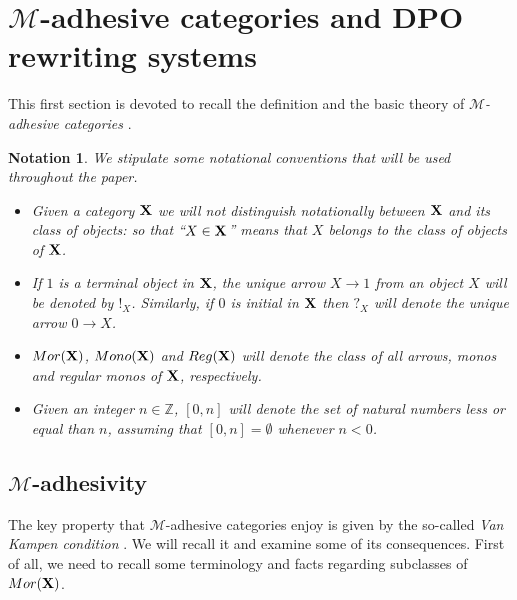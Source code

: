 \documentclass[a4paper,UKenglish,cleveref,pdftex, thm-restate,numberwithinsect,anonymous]{lipics}
\newcommand{\mor}{\mathsf{Mor}}
\newcommand{\mon}{\mathsf{Mono}}
\newcommand{\reg}{\mathsf{Reg}}
\def\X{\textbf {\textup{X}}}
\def\Set{\textbf {\textup{Set}}}
\newtheorem*{notation}{Notation}
\begin{document}
\section{$\mathcal{M}$-adhesive categories and DPO rewriting systems}\label{sec:ade}

This first section is devoted to recall the definition and the basic theory of \emph{$\mathcal{M}$-adhesive categories} \cite{azzi2019essence,ehrig2012,ehrig2014adhesive,lack2005adhesive,heindel2009category}.

\begin{notation}
  We stipulate some notational conventions that will be used
  throughout the paper.
  \begin{itemize}
  \item
    Given a category $\X$ we will not distinguish notationally
    between $\X$ and its class of objects: so that ``$X\in \X$'' means
    that $X$ belongs to the class of objects of $\X$.

  \item
    If $1$ is a terminal object in $\X$, the unique
    arrow $X\to 1$ from an object $X$ will be denoted by
    $!_X$. Similarly, if $0$ is initial in $\X$ then $?_X$ will denote
    the unique arrow $0\to
    X$. %

  \item $\mor(\X)$, $\mon(\X)$ and $\reg(\X)$ will denote the class of
    all arrows, monos and regular monos of $\X$, respectively.

  \item Given an integer $n\in \mathbb{Z}$, $[0,n]$ will denote the
    set of natural numbers less or equal than $n$, assuming that
    $[0,n]=\emptyset$ whenever $n<0$.
  \end{itemize}
\end{notation}


\subsection{$\mathcal{M}$-adhesivity}\label{subsec:ade}
The key property that $\mathcal{M}$-adhesive categories enjoy is given
by the so-called \emph{Van Kampen condition}
\cite{brown1997van,johnstone2007quasitoposes,lack2005adhesive}. We
will recall it and examine some of its consequences. First of all, we
need to recall some terminology and facts regarding subclasses of
$\mor(\X)$.
\end{document}
